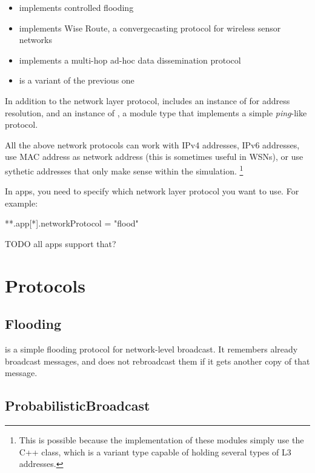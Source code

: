 \begin{itemize}
  \item {} implements controlled flooding
  \item {} implements Wise Route, a convergecasting protocol for wireless sensor networks
  \item {} implements a multi-hop ad-hoc data dissemination protocol
  \item {} is a variant of the previous one
\end{itemize}

In addition to the network layer protocol, 
includes an instance of  for address resolution,
and an instance of , a module type that
implements a simple \textit{ping}-like protocol.

All the above network protocols can work with IPv4 addresses, IPv6 addresses,
use MAC address as network address (this is sometimes useful in WSNs),
or use sythetic addresses that only make sense within the simulation.
\footnote{This is possible because the implementation of these modules
simply use the  C++ class, which is a variant type capable of
holding several types of L3 addresses.}

In apps, you need to specify which network layer protocol you want to use.
For example:

\begin{inifile}
**.app[*].networkProtocol = "flood"
\end{inifile}

TODO all apps support that?

\section{Protocols}
\label{sec:networkprotocols:protocols}

\subsection{Flooding}
\label{sec:networkprotocols:flooding}

 is a simple flooding protocol for network-level broadcast.
It remembers already broadcast messages, and does not rebroadcast
them if it gets another copy of that message.

\subsection{ProbabilisticBroadcast}
\label{sec:networkprotocols:probabilisticbroadcast}

